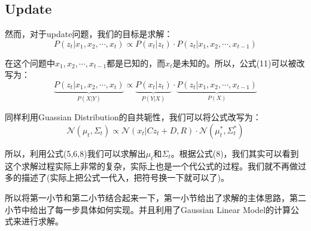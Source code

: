 \documentclass[a4paper]{article}
\begin{document}
\subsection{Update}
然而，对于update问题，我们的目标是求解：
\begin{equation}
    P(z_t|x_1,x_2,\cdots,x_t) \propto P(x_t|z_t)\cdot P(z_t|x_1,x_2,\cdots,x_{t-1})
\end{equation}

在这个问题中$x_1,x_2,\cdots,x_{t-1}$都是已知的，而$x_t$是未知的。所以，公式(11)可以被改写为：
\begin{equation}
    \underbrace{P(z_t|x_1,x_2,\cdots,x_t)}_{P(X|Y)} \propto \underbrace{P(x_t|z_t)}_{P(Y|X)}\cdot \underbrace{P(z_t|x_1,x_2,\cdots,x_{t-1})}_{P(X)}
\end{equation}

同样利用Guassian Distribution的自共轭性，我们可以将公式改写为：
\begin{equation}
    \mathcal{N}(\mu_t,\Sigma_t) \propto \mathcal{N}(x_t|Cz_t+D,R)\cdot \mathcal{N}(\mu_t^\ast,\Sigma_t^\ast)
\end{equation}

所以，利用公式(5,6,8)我们可以求解出$\mu_t$和$\Sigma_t$。根据公式(8)，我们其实可以看到这个求解过程实际上非常的复杂，实际上也是一个代公式的过程。我们就不再做过多的描述了(实际上把公式一代入，把符号换一下就可以了)。

所以将第一小节和第二小节结合起来一下，第一小节给出了求解的主体思路，第二小节中给出了每一步具体如何实现。并且利用了Gaussian Linear Model的计算公式来进行求解。
\end{document}
